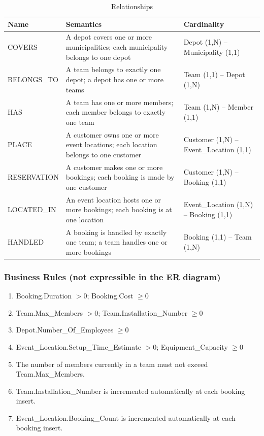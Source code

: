 \documentclass[12pt]{article}
\begin{document}
\begin{table}[H]
  \renewcommand{\arraystretch}{1.3}
  \begin{tabularx}{\textwidth}{|l|X|l|}
  \hline
  \textbf{Name} & \textbf{Semantics} & \textbf{Cardinality} \\ \hline
  COVERS & A depot covers one or more municipalities; each municipality belongs to one depot
    & Depot (1,N) -- Municipality (1,1) \\ \hline
  BELONGS\_TO & A team belongs to exactly one depot; a depot has one or more teams
    & Team (1,1) -- Depot (1,N) \\ \hline
  HAS & A team has one or more members; each member belongs to exactly one team
    & Team (1,N) -- Member (1,1) \\ \hline
  PLACE & A customer owns one or more event locations; each location belongs to one customer
    & Customer (1,N) -- Event\_Location (1,1) \\ \hline
  RESERVATION & A customer makes one or more bookings; each booking is made by one customer
    & Customer (1,N) -- Booking (1,1) \\ \hline
  LOCATED\_IN & An event location hosts one or more bookings; each booking is at one location
    & Event\_Location (1,N) -- Booking (1,1) \\ \hline
  HANDLED & A booking is handled by exactly one team; a team handles one or more bookings
    & Booking (1,1) -- Team (1,N) \\ \hline
  \end{tabularx}
  \caption{Relationships}
\end{table}

\subsubsection{Business Rules (not expressible in the ER diagram)}

\begin{enumerate}
  \item[\textbf{BR1}] Booking.Duration $> 0$; \quad Booking.Cost $\geq 0$
  \item[\textbf{BR2}] Team.Max\_Members $> 0$; \quad Team.Installation\_Number $\geq 0$
  \item[\textbf{BR3}] Depot.Number\_Of\_Employees $\geq 0$
  \item[\textbf{BR4}] Event\_Location.Setup\_Time\_Estimate $> 0$; \quad Equipment\_Capacity $\geq 0$
  \item[\textbf{BR5}] The number of members currently in a team must not exceed Team.Max\_Members.
  \item[\textbf{BR6}] Team.Installation\_Number is incremented automatically at each booking insert.
  \item[\textbf{BR7}] Event\_Location.Booking\_Count is incremented automatically at each booking insert.
\end{enumerate}
\end{document}
